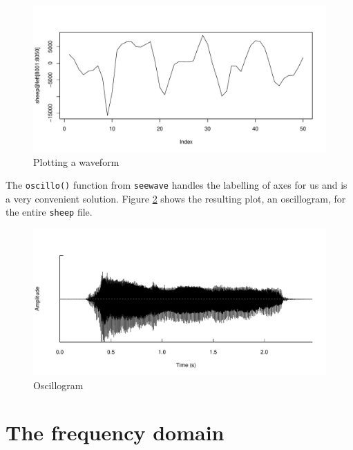 \documentclass[
]{book}
\begin{document}
\begin{figure}

{\centering \includegraphics[width=0.9\linewidth]{_main_files/figure-latex/amplitude-lines-1} 

}

\caption{Plotting a waveform}\label{fig:amplitude-lines}
\end{figure}

The \texttt{oscillo()} function from \texttt{seewave} handles the labelling of axes for us and is a very convenient solution. Figure \ref{fig:amplitude-oscillo} shows the resulting plot, an oscillogram, for the entire \texttt{sheep} file.

\begin{figure}

{\centering \includegraphics[width=0.9\linewidth]{_main_files/figure-latex/amplitude-oscillo-1} 

}

\caption{Oscillogram}\label{fig:amplitude-oscillo}
\end{figure}

\hypertarget{the-frequency-domain}{%
\section{The frequency domain}\label{the-frequency-domain}}
\end{document}
